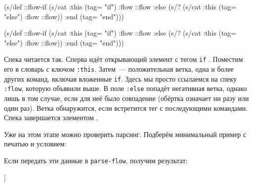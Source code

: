 \ifnarrow

\begin{clojure/lines}
(s/def ::flow-if
  (s/cat
    :this (tag= "if")
    :flow ::flow
    :else (s/? (s/cat
                 :this (tag= "else")
                 :flow ::flow))
    :end (tag= "end")))
\end{clojure/lines}

\else

\begin{clojure/lines}
(s/def ::flow-if
  (s/cat :this (tag= "if")
         :flow ::flow
         :else (s/? (s/cat :this (tag= "else")
                           :flow ::flow))
         :end (tag= "end")))
\end{clojure/lines}

\fi

Спека читается так. Сперва идёт открывающий элемент с тегом \texttt{if}
. Поместим его в словарь с ключом
\texttt{:this}. Затем~--- положительная ветка, одна и более других команд,
включая вложенные \texttt{if}.  Здесь мы просто ссылаемся на спеку
\texttt{:flow}, которую объявили выше. В поле \texttt{:else}
 попадёт негативная ветка, однако лишь в том
случае, если для неё было совпадение (обёртка  означает ни разу или
один раз). Ветка обнаружится, если встретится тег  с последующими
командами. Спека завершается элементом .

Уже на этом этапе можно проверить парсинг. Подберём минимальный пример с печатью
и условием:

\ifnarrow

\begin{clojure}
\end{clojure}

\else

\begin{clojure}
\end{clojure}

\fi

Если передать эти данные в \texttt{parse-flow}, получим результат:

\begin{clojure}
[[:if
  {:this {:command "if" :condition "..."}
   :flow [[:cmd {:command "print"
                 :text "True"}]]
   :else
   {:this {:command "else"}
    :flow [[:cmd {:command "print"
                  :text "False"}]]}
   :end {:command "end"}}]]
\end{clojure}

